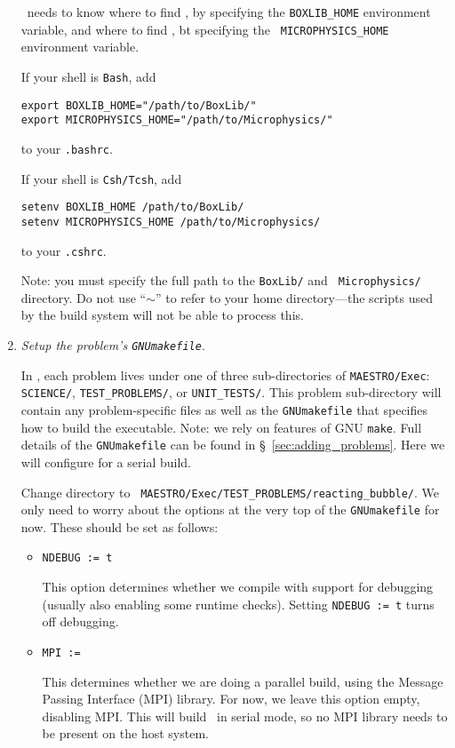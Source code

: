 \begin{enumerate}
  \maestro\ needs to know where to find \boxlib, by specifying the
  {\tt BOXLIB\_HOME} environment variable, and where
  to find \microphysics, bt specifying the {\tt
  MICROPHYSICS\_HOME} environment variable.

  If your shell is {\tt Bash}, add
  \begin{verbatim}
export BOXLIB_HOME="/path/to/BoxLib/"
export MICROPHYSICS_HOME="/path/to/Microphysics/"
  \end{verbatim}
  to your {\tt .bashrc}. 

  If your shell is {\tt Csh/Tcsh}, add
  \begin{verbatim}
setenv BOXLIB_HOME /path/to/BoxLib/
setenv MICROPHYSICS_HOME /path/to/Microphysics/
  \end{verbatim}
  to your {\tt .cshrc}.  

  Note: you must specify the full path to the {\tt BoxLib/} and {\tt
    Microphysics/} directory.  Do not use ``$\sim$'' to refer to your
  home directory---the scripts used by the build system will not be
  able to process this.

\item {\em Setup the problem's {\tt GNUmakefile}}.

  In \maestro, each problem lives under one of three sub-directories
  of {\tt MAESTRO/Exec}: {\tt SCIENCE/}, {\tt TEST\_PROBLEMS/}, or
  {\tt UNIT\_TESTS/}.  This problem sub-directory will contain any
  problem-specific files as well as the {\tt GNUmakefile} that
  specifies how to build the executable.  Note: we rely on features of
  GNU {\tt make}.  Full details of the {\tt GNUmakefile} can be found
  in \S~\ref{sec:adding_problems}.  Here we will configure for a
  serial build.

  Change directory to {\tt
    MAESTRO/Exec/TEST\_PROBLEMS/reacting\_bubble/}.  We only need to
  worry about the options at the very top of the {\tt GNUmakefile} for
  now.  These should be set as follows:
  \begin{itemize}
  \item {\tt NDEBUG := t}

    This option determines whether we compile with support for
    debugging (usually also enabling some runtime checks).  Setting
    {\tt NDEBUG := t} turns off debugging.

  \item {\tt MPI := }

    This determines whether we are doing a parallel build, using the
    Message Passing Interface (MPI) library.  For now, we leave this
    option empty, disabling MPI.  This will build \maestro\ in serial
    mode, so no MPI library needs to be present on the host system.


\end{itemize}
\end{enumerate}

